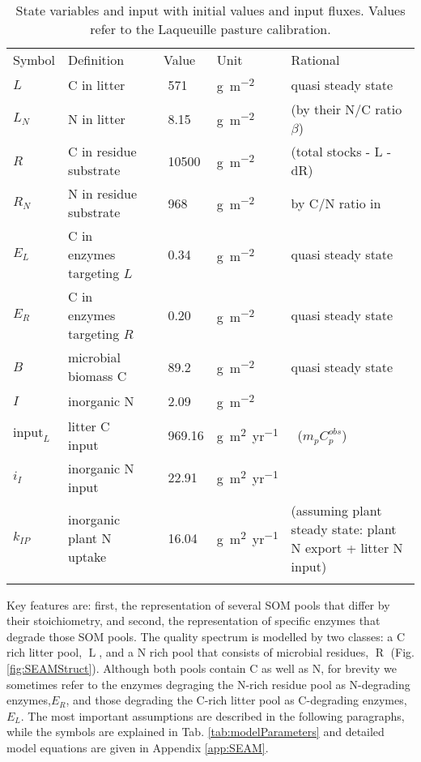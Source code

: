 \begin{table*}[t]
\caption{
\label{tab:modelStates}
State variables and input with initial values and input fluxes. Values refer to the Laqueuille pasture calibration. }
\begin{tabular}{lp{4cm}lllp{5.5cm}}
\tophline
Symbol &  Definition & \multicolumn{2}{c}{Value} & Unit & Rational \\
\middlehline
$L$ &  C in litter & & 571 & \unit{g~m^{-2}} & quasi steady state 
\\
$L_N$ &  N in litter & & 8.15 & \unit{g~m^{-2}} & \citep{Perveen14}
(by their N/C ratio $\beta$)
\\
$R$ &  C in residue substrate & & 10500 & \unit{g~m^{-2}} &
\citep{Allard07} (total stocks - L - dR)
\\
$R_N$ &  N in residue substrate & & 968 & \unit{g~m^{-2}} & by C/N
ratio in \citep{Perveen14} \\
$E_L$ &  C in enzymes targeting $L$ & & 0.34 & \unit{g~m^{-2}} & 
quasi steady state \\
$E_R$ &  C in enzymes targeting $R$ & & 0.20 & \unit{g~m^{-2}} & 
quasi steady state \\
$B$ & microbial biomass C & & 89.2 & \unit{g~m^{-2}} &  quasi steady
state \\
$I$ & inorganic N & & 2.09 & \unit{g~m^{-2}} & \citep{Perveen14} \\
\middlehline
$\mathrm{input}_{L}$ & litter C input & & 969.16 &
\unit{g~m^2yr^{-1}} & \citep{Perveen14} \, ($m_p C^{obs}_p$)\\
$i_{I}$ & inorganic N input & & 22.91 & \unit{g~m^2yr^{-1}} 
& \citep{Perveen14} \\
$k_{IP}$ & inorganic plant N uptake & & 16.04 & 
\unit{g~m^2yr^{-1}} & \citep{Perveen14} (assuming plant
steady state: plant N export + litter N input)\\
\bottomhline
\end{tabular}
\end{table*}

Key features are: first, the representation of several SOM pools that differ by
their stoichiometry, and second, the representation of specific enzymes that
degrade those SOM pools. The quality spectrum is modelled by two classes: a C
rich litter pool, $\operatorname{L}$, and a N rich pool that consists of
microbial residues, $\operatorname{R}$ (Fig. \ref{fig:SEAMStruct}). Although
both pools contain C as well as N, for brevity we sometimes refer to the enzymes
degraging the N-rich residue pool as N-degrading enzymes,$E_R$, and those
degrading the C-rich litter pool as C-degrading enzymes, $E_L$. The most
important assumptions are described in the following paragraphs, while the symbols are
explained in Tab. \ref{tab:modelParameters} and detailed model equations are
given in Appendix \ref{app:SEAM}.


